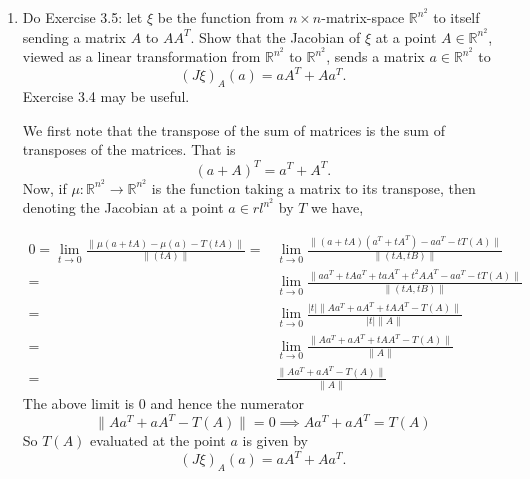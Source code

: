 \documentclass[12pt]{article}
\newcommand{\rl}{\mathbb{R}}
\begin{document}
\begin{enumerate}
\item Do Exercise 3.5: let $\xi$ be the function
    from $n \times n$-matrix-space $\rl^{n^2}$ to
    itself sending a matrix $A$ to $AA^T$. Show that
    the Jacobian of $\xi$ at a point
    $A \in \rl^{n^2}$, viewed as a linear
    transformation from $\rl^{n^2}$ to $\rl^{n^2}$,
    sends a matrix $a \in \rl^{n^2}$ to
    \[(J\xi)_A(a) = a A^T + A a^T.\]
Exercise 3.4 may be useful.
 
\begin{mybox}

    We first note that the transpose of the
    sum of matrices is the sum of transposes of
    the matrices. That is
    $$(a+A)^T=a^T+A^T.$$
    Now, if $\mu:\rl^{n^2}\to\rl^{n^2}$ is the function
    taking a matrix to its transpose, then
    denoting the Jacobian at a point $a\in rl^{n^2}$
    by $T$ we have,

    \begin{align*}
        0=\lim_{t\to 0}
        {\frac{\|\mu(a+tA)-\mu(a)-T(tA)\|}
        {\|(tA)\|}}
        =&\lim_{t\to 0}
        {\frac{\|(a+tA)(a^T+tA^T)-aa^T
        -tT(A)\|}
        {\|(tA,tB)\|}}\\
        =&\lim_{t\to 0}
        {\frac{\|aa^T+tAa^T+taA^T+t^2AA^T-aa^T
        -tT(A)\|}
        {\|(tA,tB)\|}}\\
        =&\lim_{t\to 0}
        {\frac{|t|\|Aa^T+aA^T+tAA^T-T(A)\|}
        {|t|\|A\|}}\\
        =&\lim_{t\to 0}
        {\frac{\|Aa^T+aA^T+tAA^T-T(A)\|}
        {\|A\|}}\\
        =&\frac{\|Aa^T+aA^T-T(A)\|}
        {\|A\|}
    \end{align*}
    The above limit is 0 and hence the numerator
    \[\|Aa^T+aA^T-T(A)\|=0\implies
    Aa^T+aA^T=T(A)\]
    So $T(A)$ evaluated at the point $a$ is
    given by
    \[(J\xi)_A(a) = a A^T + A a^T.\]
\end{mybox}

\end{enumerate}
\end{document}
